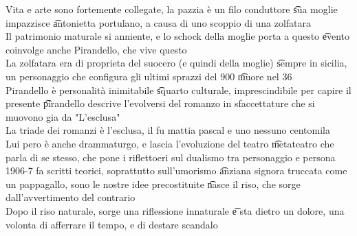 \documentclass[12pt]{article}
\begin{document}
\s[Pirandello]
Vita e arte sono fortemente collegate, la pazzia è un filo conduttore \t sua moglie impazzisce \t antonietta portulano, a causa di uno scoppio di una zolfatara \\
Il patrimonio maturale si anniente, e lo schock della moglie porta a questo \t evento coinvolge anche Pirandello, che vive questo \\
La zolfatara era di proprieta del suocero (e quindi della moglie) \t sempre in sicilia, un personaggio che configura gli ultimi sprazzi del 900 \t muore nel 36 \\
Pirandello è personalità inimitabile \t squarto culturale, imprescindibile per capire il presente \t pirandello descrive l'evolversi del romanzo in sfaccettature che si muovono gia da "L'esclusa" \\
La triade dei romanzi è l'esclusa, il fu mattia pascal e uno nessuno centomila \\
Lui pero è anche drammaturgo, e lascia l'evoluzione del teatro \t metateatro che parla di se stesso, che pone i riflettoeri sul dualismo tra personaggio e persona \\
1906-7 fa scritti teorici, soprattutto sull'umorismo \t anziana signora truccata come un pappagallo, sono le nostre idee precostituite \t nasce il riso, che sorge dall'avvertimento del contrario \\
Dopo il riso naturale, sorge una riflessione innaturale \t e sta dietro un dolore, una volonta di afferrare il tempo, e di destare scandalo
\end{document}
